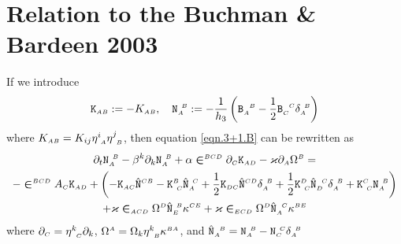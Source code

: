 \documentclass[
10pt, %
a4paper, %
oneside, %
headinclude,footinclude, %
BCOR5mm, %
]{scrartcl}
\newcommand{\sA}{\mathsmaller A}
\newcommand{\sB}{\mathsmaller B}
\newcommand{\sC}{\mathsmaller C}
\newcommand{\sD}{\mathsmaller D}
\newcommand{\sE}{\mathsmaller E}
\newcommand{\pd}[1]{\partial_{#1}}
\newcommand{\mg}[1]{\kappa_{#1}}			%
\newcommand{\MG}[1]{\kappa^{#1}}			%
\newcommand{\tetrsymbol}{h}
\newcommand{\itetrsymbol}{\eta}
\newcommand{\itetr}[2]{\itetrsymbol^{#1}_{\phantom{#1}#2}}
\newcommand{\tetr}[2]{\tetrsymbol^{#1}_{\phantom{#1}#2}}
\newcommand{\detTetr}{\tetrsymbol}
\newcommand{\Dfin}[2]{\mathtt{D}_{\phantom{#2}#1}^{#2}}	%
\newcommand{\Efin}[2]{\mathtt{E}^{#1}_{\phantom{#1}#2}}	%
\newcommand{\Kbuch}[2]{\mathtt{K}_{{#1}{#2}}}	%
\newcommand{\Nbuch}[2]{\mathtt{N}_{#1}^{\ #2}}	%
\newcommand{\Kbuchmix}[2]{\mathtt{K}^{#1}_{\ #2}}	%
\newcommand{\Bfinmixx}[2]{\mathtt{B}_{#1}^{\phantom{#1}#2}}	%
\newcommand{\LCsymb}{\bm{\in}}    %
\newcommand{\KD}[2]{\delta^{\ #1}_{#2}}
\newcommand{\lapse}{\alpha}
\newcommand{\shift}[1]{\beta^{#1}}
\begin{document}
%

\section{Relation to the Buchman \& Bardeen 2003}

If we introduce
\begin{equation}
	\Kbuch{\sA}{\sB} := -K_{\sA\sB},  
	\quad
	\Nbuch{\sA}{\sB} := -\frac{1}{\detTetr_3}\left(  
		\Bfinmixx{\sA}{\sB} - \frac{1}{2} \Bfinmixx{\sC}{\sC} \KD{\sB}{\sA}
	\right) 
\end{equation}
where $ K_{\sA\sB} = K_{ij} \itetr{i}{\sA}\itetr{j}{\sB} $, then equation \eqref{eqn.3+1.B} can be 
rewritten as
\begin{multline}\label{eqn.Npde}
	\pd{t} \Nbuch{\sA}{\sB} - \shift{k}\pd{k}\Nbuch{\sA}{\sB} + \lapse \LCsymb^{\sB\sC\sD} 
	\pd{\sC} \Kbuch{\sA}{\sD}
	-\varkappa \pd{\sA} \Omega^{\sB} = \\
	- \LCsymb^{\sB\sC\sD} A_{\sC} \Kbuch{\sA}{\sD}
	+
	\left(
		- \Kbuch{\sA}{\sC} \hat{\mathtt{N}}^{\sC\sB} - \Kbuchmix{\sB}{\sC} 
		\hat{\mathtt{N}}_{\sA}^{\ \sC}
		+ \frac12 \Kbuch{\sD}{\sC} \hat{\mathtt{N}}^{\sC\sD} \KD{\sB}{\sA}
		+ \frac12 \Kbuchmix{\sD}{\sC} \hat{\mathtt{N}}_{\sD}^{\ \,\sC} \KD{\sB}{\sA}
		+ \Kbuchmix{\sC}{\sC} \Nbuch{\sA}{\sB}
	\right) \\
	+ \varkappa \LCsymb_{\sA\sC\sD} \Omega^{\sD} \hat{\mathtt{N}}_{\sE}^{\ \sB} \MG{\sC\sE}
	+ \varkappa \LCsymb_{\sE\sC\sD} \Omega^{\sD} \hat{\mathtt{N}}_{\sA}^{\ \,\sC} \MG{\sB\sE}
\end{multline}
where $ \pd{\sC} = \itetr{k}{\sC} \pd{k} $, $ \Omega^{\sA} = \Omega_k \itetr{k}{\sB}\MG{\sB\sA} $,
and $ \hat{\mathtt{N}}_{\sA}^{\ \,\sB} = \Nbuch{\sA}{\sB} - \Nbuch{\sC}{\sC}\KD{\sB}{\sA} $
\end{document}
